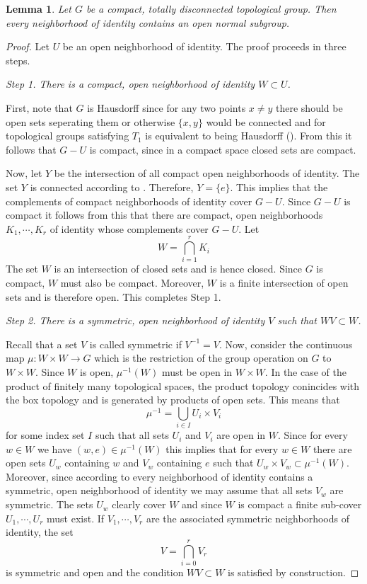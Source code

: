 \documentclass[12pt]{article}
\newtheorem{lem}[thm]{Lemma}
\theoremstyle{definition}
\theoremstyle{remark}
\begin{document}
    \begin{lem}\label{lem:ons}
        Let $G$ be a compact, totally disconnected topological group. Then every neighborhood of identity contains an open normal subgroup.
    \end{lem}

    \begin{proof}
        Let $U$ be an open neighborhood of identity. The proof proceeds in three steps.

        \noindent\emph{Step 1. There is a compact, open neighborhood of identity $W\subset U$.}

        First, note that $G$ is Hausdorff since for any two points $x\neq y$ there should be open sets seperating them or otherwise $\{x,y\}$ would be connected and for topological groups satisfying $T_1$ is equivalent to being Hausdorff (\cite[Proposition 1-3]{FANF1999}). From this it follows that $G-U$ is compact, since in a compact space closed sets are compact.

        Now, let $Y$ be the intersection of all compact open neighborhoods of identity. The set $Y$ is connected according to \cite[Lemma 1-16]{FANF1999}. Therefore, $Y=\{e\}$. This implies that the complements of compact neighborhoods of identity cover $G-U$. Since $G-U$ is compact it follows from this that there are compact, open neighborhoods $K_1,\cdots,K_r$ of identity whose complements cover $G-U$. Let
        $$
        W=\bigcap_{i=1}^r K_i
        $$
        The set $W$ is an intersection of closed sets and is hence closed. Since $G$ is compact, $W$ must also be compact. Moreover, $W$ is a finite intersection of open sets and is therefore open. This completes Step 1.
        
        \noindent\emph{Step 2. There is a symmetric, open neighborhood of identity $V$ such that $WV\subset W$.}

        Recall that a set $V$ is called symmetric if $V^{-1}=V$. Now, consider the continuous map $\mu\colon W\times W \to G$ which is the restriction of the group operation on $G$ to $W \times W$. Since $W$ is open, $\mu^{-1}(W)$ must be open in $W \times W$. In the case of the product of finitely many topological spaces, the product topology conincides with the box topology and is generated by products of open sets. This means that
        $$ \mu^{-1} = \bigcup_{i \in I} U_i \times V_i $$
        for some index set $I$ such that all sets $U_i$ and $V_i$ are open in $W$. Since for every $w \in W$ we have $(w,e)\in\mu^{-1}(W)$ this implies that for every $w\in W$ there are open sets $U_w$ containing $w$ and $V_w$ containing $e$ such that $U_w\times V_w\subset \mu^{-1}(W)$. Moreover, since according to \cite[Proposition 1-1(ii)]{FANF1999} every neighborhood of identity contains a symmetric, open neighborhood of identity we may assume that all sets $V_w$ are symmetric. The sets $U_w$ clearly cover $W$ and since $W$ is compact a finite sub-cover $U_1,\cdots,U_r$ must exist. If $V_1,\cdots,V_r$ are the associated symmetric neighborhoods of identity, the set
        $$ V = \bigcap_{i=0}^r V_r $$
        is symmetric and open and the condition $WV\subset W$ is satisfied by construction.


\end{proof}
\end{document}
